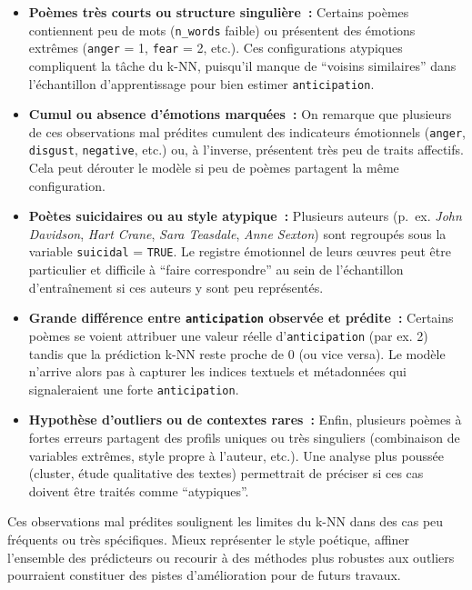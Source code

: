 \documentclass[11pt]{article}
\begin{document}
\begin{itemize}
	\item \textbf{Poèmes très courts ou structure singulière :} Certains poèmes contiennent peu de mots (\texttt{n\_words} faible) ou présentent des émotions extrêmes (\texttt{anger} = 1, \texttt{fear} = 2, etc.). Ces configurations atypiques compliquent la tâche du k-NN, puisqu’il manque de “voisins similaires” dans l’échantillon d’apprentissage pour bien estimer \texttt{anticipation}.
	
	\item \textbf{Cumul ou absence d’émotions marquées :} On remarque que plusieurs de ces observations mal prédites cumulent des indicateurs émotionnels (\texttt{anger}, \texttt{disgust}, \texttt{negative}, etc.) ou, à l’inverse, présentent très peu de traits affectifs. Cela peut dérouter le modèle si peu de poèmes partagent la même configuration.
	
	\item \textbf{Poètes suicidaires ou au style atypique :} Plusieurs auteurs (p.~ex. \emph{John Davidson}, \emph{Hart Crane}, \emph{Sara Teasdale}, \emph{Anne Sexton}) sont regroupés sous la variable \texttt{suicidal} = \texttt{TRUE}. Le registre émotionnel de leurs œuvres peut être particulier et difficile à “faire correspondre” au sein de l’échantillon d’entraînement si ces auteurs y sont peu représentés.
	
	\item \textbf{Grande différence entre \texttt{anticipation} observée et prédite :} Certains poèmes se voient attribuer une valeur réelle d’\texttt{anticipation} (par ex. 2) tandis que la prédiction k-NN reste proche de 0 (ou vice versa). Le modèle n’arrive alors pas à capturer les indices textuels et métadonnées qui signaleraient une forte \texttt{anticipation}.
	
	\item \textbf{Hypothèse d’outliers ou de contextes rares :} Enfin, plusieurs poèmes à fortes erreurs partagent des profils uniques ou très singuliers (combinaison de variables extrêmes, style propre à l’auteur, etc.). Une analyse plus poussée (cluster, étude qualitative des textes) permettrait de préciser si ces cas doivent être traités comme “atypiques”.
\end{itemize}

Ces observations mal prédites soulignent les limites du k-NN dans des cas peu fréquents ou très spécifiques. Mieux représenter le style poétique, affiner l’ensemble des prédicteurs ou recourir à des méthodes plus robustes aux outliers pourraient constituer des pistes d’amélioration pour de futurs travaux.
\end{document}
